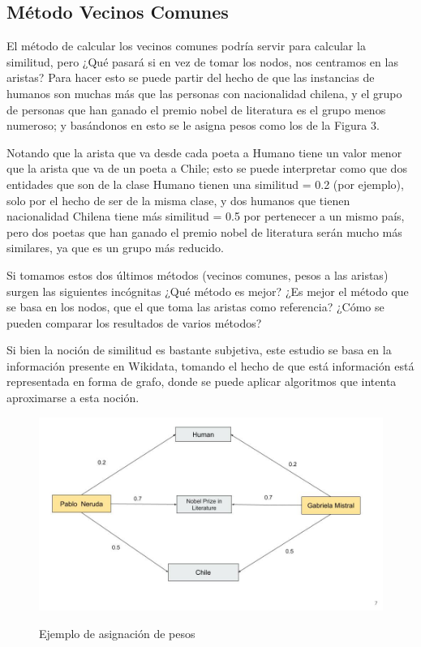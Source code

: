 \newpage
\subsection{Método Vecinos Comunes}





El método de calcular los vecinos comunes podría servir para calcular la similitud, pero  ¿Qué pasará si en vez de tomar los nodos, nos centramos en las aristas? Para hacer esto se puede partir del hecho de que las instancias de humanos son muchas más que las personas con nacionalidad chilena, y el grupo de personas que han ganado el premio nobel de literatura es el grupo  menos numeroso; y basándonos en esto se le asigna pesos como los de la Figura 3. 


Notando que la arista que va desde cada poeta a Humano tiene un valor menor que la arista que va de  un poeta a Chile; esto se puede interpretar como que  dos entidades que son de la clase Humano tienen una similitud = 0.2 (por ejemplo), solo por el hecho de ser de la misma clase, y dos humanos que tienen nacionalidad Chilena tiene más similitud = 0.5 por pertenecer a un mismo país, pero dos poetas que han ganado el premio nobel de literatura serán mucho más similares, ya que es un grupo más reducido. 

Si tomamos estos dos últimos métodos (vecinos comunes, pesos a las aristas) surgen las siguientes incógnitas ¿Qué método es mejor? ¿Es mejor el método que se basa en los nodos, que el que toma las aristas como referencia? ¿Cómo se pueden comparar los resultados de varios métodos?  

Si bien la noción de similitud es bastante subjetiva, este estudio se basa en la información presente en Wikidata, tomando el hecho de que está información está representada en forma de grafo, donde se puede aplicar algoritmos que intenta aproximarse a esta noción. 
 
\begin{figure}[h]
\centering
\includegraphics[scale=0.3]{Imagen3_1.jpg}
\label{fig:Imagen3 }
\caption{Ejemplo de asignación de pesos}
\end{figure}
 
